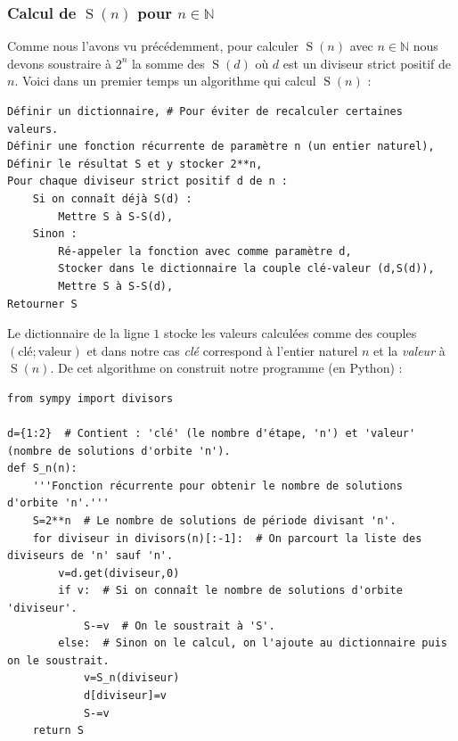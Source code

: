 \documentclass[a4paper,french,12pt]{article}
\begin{document}
\subsubsection{Calcul de $\operatorname{S}\left(n\right)$ pour $n\in\mathbb{N}$}

Comme nous l'avons vu précédemment, pour calculer $\operatorname{S}\left(n\right)$ avec $n\in\mathbb{N}$ nous devons soustraire à $2^n$ la somme des $\operatorname{S}\left(d\right)$ où $d$ est un diviseur strict positif de $n$. Voici dans un premier temps un algorithme qui calcul $\operatorname{S}\left(n\right)$ :

\begin{center}
\begin{verbatim}
Définir un dictionnaire, # Pour éviter de recalculer certaines valeurs.
Définir une fonction récurrente de paramètre n (un entier naturel),
Définir le résultat S et y stocker 2**n,
Pour chaque diviseur strict positif d de n :
    Si on connaît déjà S(d) :
        Mettre S à S-S(d),
    Sinon :
        Ré-appeler la fonction avec comme paramètre d,
        Stocker dans le dictionnaire la couple clé-valeur (d,S(d)),
        Mettre S à S-S(d),
Retourner S
\end{verbatim}
\end{center}

Le dictionnaire de la ligne $1$ stocke les valeurs calculées comme des couples $\left(\text{clé};\text{valeur}\right)$ et dans notre cas \emph{clé} correspond à l'entier naturel $n$ et la \emph{valeur} à $\operatorname{S}\left(n\right)$. De cet algorithme on construit notre programme (en Python) :
    
\begin{center}
\begin{verbatim}
from sympy import divisors

d={1:2}  # Contient : 'clé' (le nombre d'étape, 'n') et 'valeur' (nombre de solutions d'orbite 'n').
def S_n(n):
    '''Fonction récurrente pour obtenir le nombre de solutions d'orbite 'n'.'''
    S=2**n  # Le nombre de solutions de période divisant 'n'.
    for diviseur in divisors(n)[:-1]:  # On parcourt la liste des diviseurs de 'n' sauf 'n'.
        v=d.get(diviseur,0)
        if v:  # Si on connaît le nombre de solutions d'orbite 'diviseur'.
            S-=v  # On le soustrait à 'S'.
        else:  # Sinon on le calcul, on l'ajoute au dictionnaire puis on le soustrait.
            v=S_n(diviseur)
            d[diviseur]=v
            S-=v
    return S
\end{verbatim}
\end{center}
\end{document}

